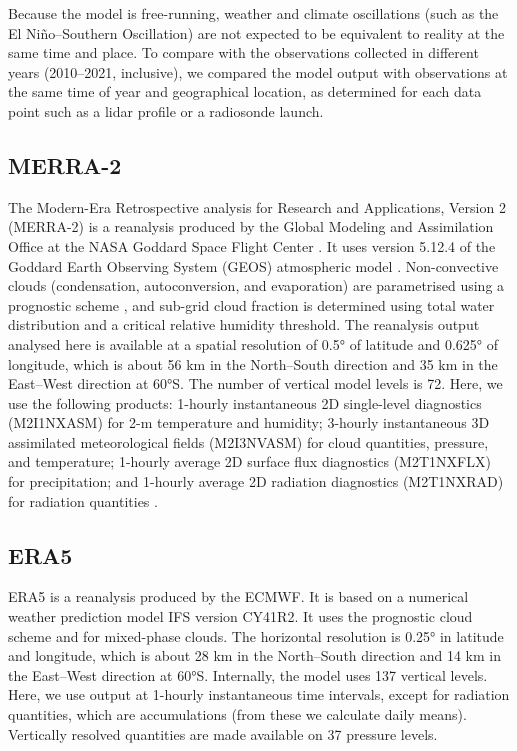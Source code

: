 \documentclass[draft]{agujournal2019}
\begin{document}
Because the model is free-running, weather and climate oscillations (such as
the El Niño--Southern Oscillation) are not expected to be equivalent to reality
at the same time and place. To compare with the observations collected in
different years (2010--2021, inclusive), we compared the model output with
observations at the same time of year and geographical location, as determined
for each data point such as a lidar profile or a radiosonde launch.

\subsection{MERRA-2}

The Modern-Era Retrospective analysis for Research and Applications, Version 2
(MERRA-2) is a reanalysis produced by the Global Modeling and Assimilation
Office at the NASA Goddard Space Flight Center .  It uses
version 5.12.4 of the Goddard Earth Observing System (GEOS) atmospheric model
. Non-convective clouds (condensation,
autoconversion, and evaporation) are parametrised using a prognostic scheme
, and sub-grid cloud fraction is determined using total
water distribution and a critical relative humidity threshold. The reanalysis
output analysed here is available at a spatial resolution of 0.5° of latitude
and 0.625° of longitude, which is about 56 km in the North--South direction and
35 km in the East--West direction at 60°S. The number of vertical model levels
is 72. Here, we use the following products: 1-hourly instantaneous 2D
single-level diagnostics (M2I1NXASM) for 2-m temperature and humidity; 3-hourly
instantaneous 3D assimilated meteorological fields (M2I3NVASM) for cloud
quantities, pressure, and temperature; 1-hourly average 2D surface flux
diagnostics (M2T1NXFLX) for precipitation; and 1-hourly average 2D radiation
diagnostics (M2T1NXRAD) for radiation quantities .

\subsection{ERA5}

ERA5  is a reanalysis produced by the ECMWF.  It is based on a
numerical weather prediction model IFS version CY41R2.  It uses the
 prognostic cloud scheme and  for
mixed-phase clouds. The horizontal resolution is 0.25° in latitude and
longitude, which is about 28 km in the North--South direction and 14 km in the
East--West direction at 60°S.  Internally, the model uses 137 vertical levels.
Here, we use output at 1-hourly instantaneous time intervals, except for
radiation quantities, which are accumulations (from these we calculate daily
means).  Vertically resolved quantities are made available on 37 pressure
levels.
\end{document}

